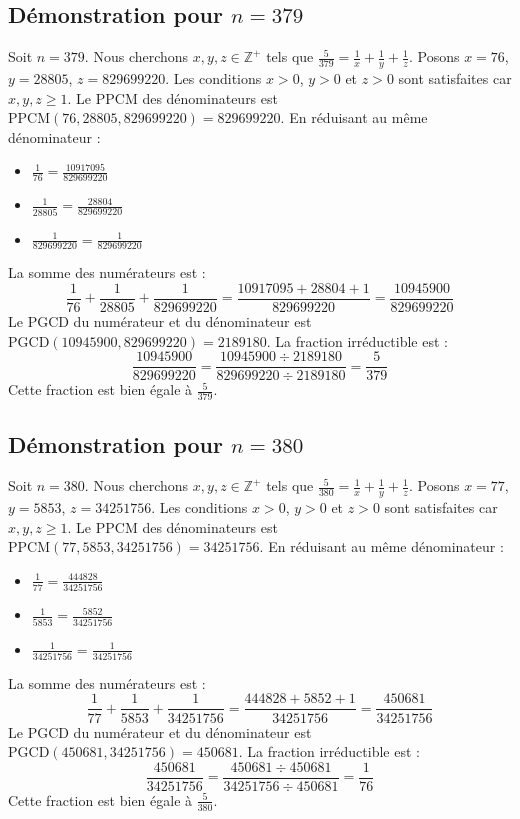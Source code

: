 \documentclass[11pt,a4paper]{article}
\begin{document}
\subsection{Démonstration pour $n = 379$}
Soit $n = 379$. Nous cherchons $x, y, z \in \mathbb{Z}^{+}$ tels que $\frac{5}{379} = \frac{1}{x} + \frac{1}{y} + \frac{1}{z}$.
Posons $x = 76$, $y = 28805$, $z = 829699220$.
Les conditions $x > 0$, $y > 0$ et $z > 0$ sont satisfaites car $x, y, z \geq 1$.
Le PPCM des dénominateurs est $\text{PPCM}(76, 28805, 829699220) = 829699220$.
En réduisant au même dénominateur :
\begin{itemize}
    \item $\frac{1}{76} = \frac{10917095}{829699220}$
    \item $\frac{1}{28805} = \frac{28804}{829699220}$
    \item $\frac{1}{829699220} = \frac{1}{829699220}$
\end{itemize}
La somme des numérateurs est :
$$ \frac{1}{76} + \frac{1}{28805} + \frac{1}{829699220} = \frac{10917095 + 28804 + 1}{829699220} = \frac{10945900}{829699220} $$
Le PGCD du numérateur et du dénominateur est $\text{PGCD}(10945900, 829699220) = 2189180$.
La fraction irréductible est :
$$ \frac{10945900}{829699220} = \frac{10945900 \div 2189180}{829699220 \div 2189180} = \frac{5}{379} $$
Cette fraction est bien égale à $\frac{5}{379}$.

\subsection{Démonstration pour $n = 380$}
Soit $n = 380$. Nous cherchons $x, y, z \in \mathbb{Z}^{+}$ tels que $\frac{5}{380} = \frac{1}{x} + \frac{1}{y} + \frac{1}{z}$.
Posons $x = 77$, $y = 5853$, $z = 34251756$.
Les conditions $x > 0$, $y > 0$ et $z > 0$ sont satisfaites car $x, y, z \geq 1$.
Le PPCM des dénominateurs est $\text{PPCM}(77, 5853, 34251756) = 34251756$.
En réduisant au même dénominateur :
\begin{itemize}
    \item $\frac{1}{77} = \frac{444828}{34251756}$
    \item $\frac{1}{5853} = \frac{5852}{34251756}$
    \item $\frac{1}{34251756} = \frac{1}{34251756}$
\end{itemize}
La somme des numérateurs est :
$$ \frac{1}{77} + \frac{1}{5853} + \frac{1}{34251756} = \frac{444828 + 5852 + 1}{34251756} = \frac{450681}{34251756} $$
Le PGCD du numérateur et du dénominateur est $\text{PGCD}(450681, 34251756) = 450681$.
La fraction irréductible est :
$$ \frac{450681}{34251756} = \frac{450681 \div 450681}{34251756 \div 450681} = \frac{1}{76} $$
Cette fraction est bien égale à $\frac{5}{380}$.
\end{document}
